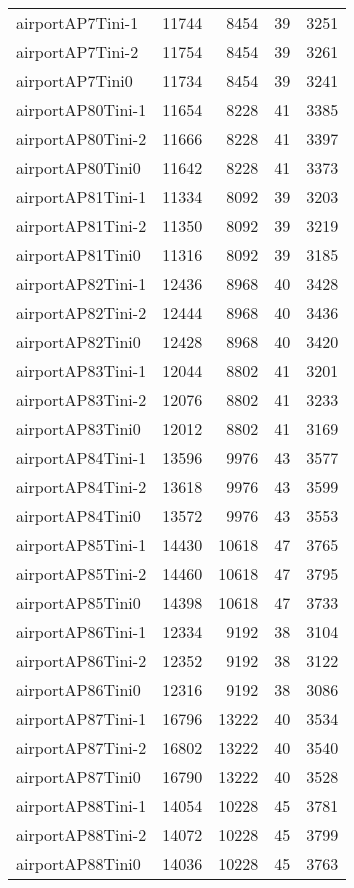\begin{tabular}{lrrrr}
airportAP7Tini-1 & 11744 & 8454 & 39 & 3251 \\
airportAP7Tini-2 & 11754 & 8454 & 39 & 3261 \\
airportAP7Tini0 & 11734 & 8454 & 39 & 3241 \\
airportAP80Tini-1 & 11654 & 8228 & 41 & 3385 \\
airportAP80Tini-2 & 11666 & 8228 & 41 & 3397 \\
airportAP80Tini0 & 11642 & 8228 & 41 & 3373 \\
airportAP81Tini-1 & 11334 & 8092 & 39 & 3203 \\
airportAP81Tini-2 & 11350 & 8092 & 39 & 3219 \\
airportAP81Tini0 & 11316 & 8092 & 39 & 3185 \\
airportAP82Tini-1 & 12436 & 8968 & 40 & 3428 \\
airportAP82Tini-2 & 12444 & 8968 & 40 & 3436 \\
airportAP82Tini0 & 12428 & 8968 & 40 & 3420 \\
airportAP83Tini-1 & 12044 & 8802 & 41 & 3201 \\
airportAP83Tini-2 & 12076 & 8802 & 41 & 3233 \\
airportAP83Tini0 & 12012 & 8802 & 41 & 3169 \\
airportAP84Tini-1 & 13596 & 9976 & 43 & 3577 \\
airportAP84Tini-2 & 13618 & 9976 & 43 & 3599 \\
airportAP84Tini0 & 13572 & 9976 & 43 & 3553 \\
airportAP85Tini-1 & 14430 & 10618 & 47 & 3765 \\
airportAP85Tini-2 & 14460 & 10618 & 47 & 3795 \\
airportAP85Tini0 & 14398 & 10618 & 47 & 3733 \\
airportAP86Tini-1 & 12334 & 9192 & 38 & 3104 \\
airportAP86Tini-2 & 12352 & 9192 & 38 & 3122 \\
airportAP86Tini0 & 12316 & 9192 & 38 & 3086 \\
airportAP87Tini-1 & 16796 & 13222 & 40 & 3534 \\
airportAP87Tini-2 & 16802 & 13222 & 40 & 3540 \\
airportAP87Tini0 & 16790 & 13222 & 40 & 3528 \\
airportAP88Tini-1 & 14054 & 10228 & 45 & 3781 \\
airportAP88Tini-2 & 14072 & 10228 & 45 & 3799 \\
airportAP88Tini0 & 14036 & 10228 & 45 & 3763 \\

\end{tabular}
